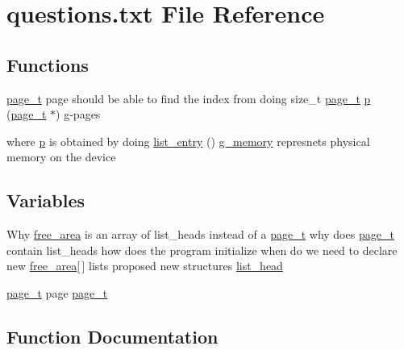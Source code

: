 \hypertarget{questions_8txt}{}\section{questions.\+txt File Reference}
\label{questions_8txt}
\subsection*{Functions}
\begin{DoxyCompactItemize}
\item 
\hyperlink{structpage__t}{page\+\_\+t} page should be able to find the index from doing size\+\_\+t \hyperlink{structpage__t}{page\+\_\+t} \hyperlink{questions_8txt_a26715c6b7265a37942b584682de07888}{p} (\hyperlink{structpage__t}{page\+\_\+t} $\ast$) g-\/pages
\item 
where \hyperlink{questions_8txt_a26715c6b7265a37942b584682de07888}{p} is obtained by doing \hyperlink{questions_8txt_a31d704c89399a7aa802039c20611bcfa}{list\+\_\+entry} () \hyperlink{buddy_8c_ad6d688a63e574ba24b0247b2bec1e31d}{g\+\_\+memory} represnets physical memory on the device
\end{DoxyCompactItemize}
\subsection*{Variables}
\begin{DoxyCompactItemize}
\item 
Why \hyperlink{buddy_8c_a6d390a89d1f6c149cef6284d2c0351df}{free\+\_\+area} is an array of list\+\_\+heads instead of a \hyperlink{structpage__t}{page\+\_\+t} why does \hyperlink{structpage__t}{page\+\_\+t} contain list\+\_\+heads how does the program initialize when do we need to declare new \hyperlink{buddy_8c_a6d390a89d1f6c149cef6284d2c0351df}{free\+\_\+area}\mbox{[}$\,$\mbox{]} lists proposed new structures \hyperlink{questions_8txt_ae89fe736b49c3398ad936c5484a39376}{list\+\_\+head}
\item 
\hyperlink{structpage__t}{page\+\_\+t} page \hyperlink{questions_8txt_a9e16af15ab7a6b1c0a466dd5d684ff81}{page\+\_\+t}
\end{DoxyCompactItemize}


\subsection{Function Documentation}
